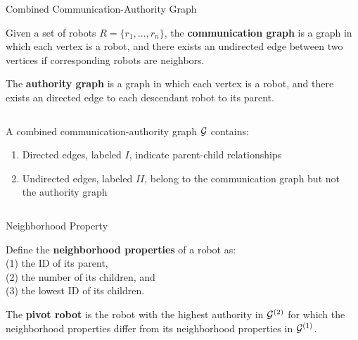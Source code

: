 \documentclass[10pt]{beamer}
\begin{document}
\begin{frame}{Combined Communication-Authority Graph}
  \begin{definition}
    \small{Given a set of robots $R =\{r_1, ..., r_n\}$, the \textbf{communication
        graph} is a graph in which each vertex is a robot, and there exists an
      undirected edge between two vertices if corresponding robots are
      neighbors.}
  \end{definition}
  \begin{definition}
    \small{The \textbf{authority graph} is a graph in which each vertex is a
      robot, and there exists an directed edge to each descendant robot to its
      parent.}
  \end{definition}
  \begin{columns}
    \begin{column}{0.5\textwidth}
      \small{A combined communication-authority graph $\mathcal{G}$ contains:
        \begin{enumerate}
        \item Directed edges, labeled $I$, indicate parent-child relationships
        \item Undirected edges, labeled $II$, belong to the communication graph
          but not the authority graph
        \end{enumerate}
      }
    \end{column}
    \begin{column}{0.4\textwidth}
      
    \end{column}
  \end{columns}
\end{frame}
\begin{frame}{Neighborhood Property}
  \begin{definition}
    \small{Define the \textbf{neighborhood properties} of a robot as:\\
      (1) the ID of its parent,\\
      (2) the number of its children, and\\
      (3) the lowest ID of its children.}
  \end{definition}
  \begin{definition}
    \small {The \textbf{pivot robot} is the robot with the highest authority in
      $\mathcal{G}^{(2)}$ for which the neighborhood properties differ from its
      neighborhood properties in $\mathcal{G}^{(1)}$.}
  \end{definition}
    
\end{frame}
\end{document}
